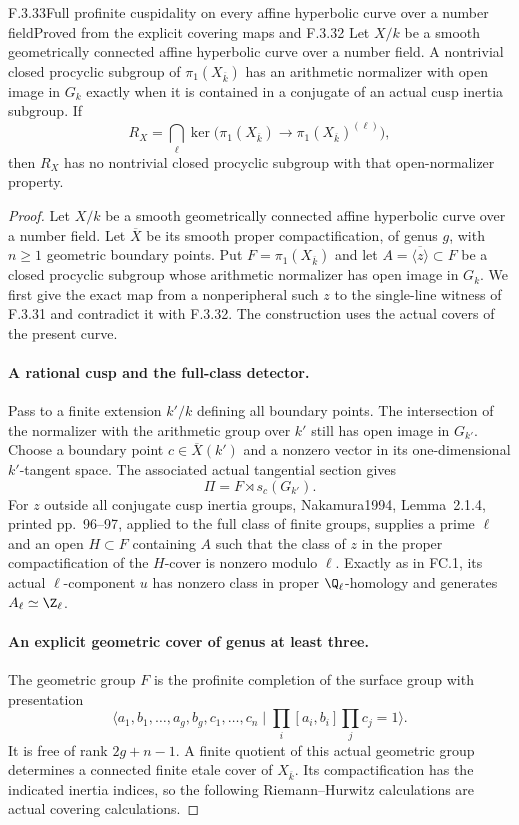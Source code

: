 \begin{result}{F.3.33}{Full profinite cuspidality on every affine hyperbolic curve over a number field}{Proved from the explicit covering maps and F.3.32}
Let $X/k$ be a smooth geometrically connected affine hyperbolic curve over a number field. A nontrivial closed procyclic subgroup of $\pi_1(X_{\overline k})$ has an arithmetic normalizer with open image in $G_k$ exactly when it is contained in a conjugate of an actual cusp inertia subgroup. If
\[
 R_X=\bigcap_\ell\ker\bigl(\pi_1(X_{\overline k})
                 \longrightarrow\pi_1(X_{\overline k})^{(\ell)}\bigr),
\]
then $R_X$ has no nontrivial closed procyclic subgroup with that open-normalizer property.
\end{result}
\begin{proof}

Let $X/k$ be a smooth geometrically connected affine hyperbolic curve
over a number field. Let $\overline X$ be its smooth proper
compactification, of genus $g$, with $n\geq1$ geometric boundary
points. Put $F=\pi_1(X_{\overline k})$ and let
$A=\overline{\langle z\rangle}\subset F$ be a closed procyclic
subgroup whose arithmetic normalizer has open image in $G_k$.
We first give the exact map from a nonperipheral such $z$ to the
single-line witness of F.3.31 and contradict it with F.3.32.
The construction uses the actual covers of the present curve.

\paragraph{A rational cusp and the full-class detector.}
Pass to a finite extension $k'/k$ defining all boundary points.
The intersection of the normalizer with the arithmetic group
over $k'$ still has open image in $G_{k'}$. Choose a boundary
point $c\in\overline X(k')$ and a nonzero vector in its
one-dimensional $k'$-tangent space. The associated actual
tangential section gives
\[
       \Pi=F\rtimes s_c(G_{k'}).
\]
For $z$ outside all conjugate cusp inertia groups,
Nakamura1994, Lemma~2.1.4, printed pp.~96--97\cite{AuditNakamura1994}, applied to
the full class of finite groups, supplies a prime $\ell$
and an open $H\subset F$ containing $A$ such that the
class of $z$ in the proper compactification of the
$H$-cover is nonzero modulo $\ell$. Exactly as in FC.1,
its actual $\ell$-component $u$ has nonzero class in
proper $\Q_\ell$-homology and generates
$A_\ell\simeq\Z_\ell$.

\paragraph{An explicit geometric cover of genus at least three.}
The geometric group $F$ is the profinite completion of the
surface group with presentation
\[
 \langle a_1,b_1,\ldots,a_g,b_g,c_1,\ldots,c_n\mid
        \prod_i[a_i,b_i]\prod_jc_j=1\rangle .
\]
It is free of rank $2g+n-1$. A finite quotient of this
actual geometric group determines a connected finite
etale cover of $X_{\overline k}$. Its compactification
has the indicated inertia indices, so the following
Riemann--Hurwitz calculations are actual covering
calculations.


\end{proof}
